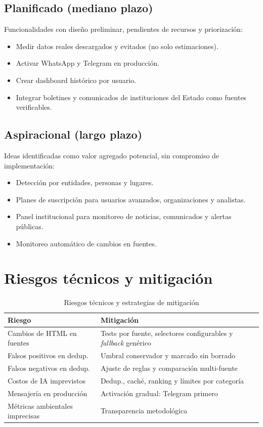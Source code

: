\subsection{Planificado (mediano plazo)}

Funcionalidades con dise\~no preliminar, pendientes de recursos y priorizaci\'on:

\begin{itemize}[nosep]
    \item Medir datos reales descargados y evitados (no solo estimaciones).
    \item Activar WhatsApp y Telegram en producci\'on.
    \item Crear dashboard hist\'orico por usuario.
    \item Integrar boletines y comunicados de instituciones del Estado como fuentes verificables.
\end{itemize}

\subsection{Aspiracional (largo plazo)}

Ideas identificadas como valor agregado potencial, sin compromiso de implementaci\'on:

\begin{itemize}[nosep]
    \item Detecci\'on por entidades, personas y lugares.
    \item Planes de suscripci\'on para usuarios avanzados, organizaciones y analistas.
    \item Panel institucional para monitoreo de noticias, comunicados y alertas p\'ublicas.
    \item Monitoreo autom\'atico de cambios en fuentes.
\end{itemize}

\section{Riesgos t\'ecnicos y mitigaci\'on}

\begin{table}[H]
\centering
\begin{tabular}{p{5cm}p{8cm}}
\toprule
\textbf{Riesgo} & \textbf{Mitigaci\'on} \\
\midrule
Cambios de HTML en fuentes & Tests por fuente, selectores configurables y \textit{fallback} gen\'erico \\
Falsos positivos en dedup. & Umbral conservador y marcado sin borrado \\
Falsos negativos en dedup. & Ajuste de reglas y comparaci\'on multi-fuente \\
Costos de IA imprevistos & Dedup., cach\'e, ranking y l\'imites por categor\'ia \\
Mensajer\'ia en producci\'on & Activaci\'on gradual: Telegram primero \\
M\'etricas ambientales imprecisas & Transparencia metodol\'ogica \\
\bottomrule
\end{tabular}
\caption{Riesgos t\'ecnicos y estrategias de mitigaci\'on}
\end{table}

